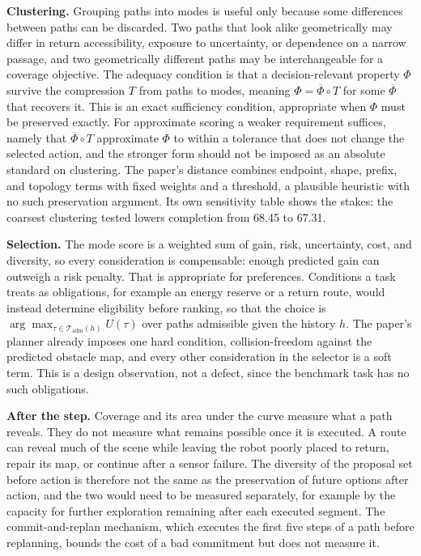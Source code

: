 \documentclass[11pt]{article}
\theoremstyle{plain}
\theoremstyle{remark}
\begin{document}
\textbf{Clustering.} Grouping paths into modes is useful only because some differences between paths can be discarded. Two paths that look alike geometrically may differ in return accessibility, exposure to uncertainty, or dependence on a narrow passage, and two geometrically different paths may be interchangeable for a coverage objective. The adequacy condition is that a decision-relevant property $\Phi$ survive the compression $T$ from paths to modes, meaning $\Phi=\overline{\Phi}\circ T$ for some $\overline{\Phi}$ that recovers it. This is an exact sufficiency condition, appropriate when $\Phi$ must be preserved exactly. For approximate scoring a weaker requirement suffices, namely that $\overline{\Phi}\circ T$ approximate $\Phi$ to within a tolerance that does not change the selected action, and the stronger form should not be imposed as an absolute standard on clustering. The paper's distance combines endpoint, shape, prefix, and topology terms with fixed weights and a threshold, a plausible heuristic with no such preservation argument. Its own sensitivity table shows the stakes: the coarsest clustering tested lowers completion from 68.45 to 67.31.

\textbf{Selection.} The mode score is a weighted sum of gain, risk, uncertainty, cost, and diversity, so every consideration is compensable: enough predicted gain can outweigh a risk penalty. That is appropriate for preferences. Conditions a task treats as obligations, for example an energy reserve or a return route, would instead determine eligibility before ranking, so that the choice is $\arg\max_{\tau\in\mathcal T_{\mathrm{adm}}(h)}U(\tau)$ over paths admissible given the history $h$. The paper's planner already imposes one hard condition, collision-freedom against the predicted obstacle map, and every other consideration in the selector is a soft term. This is a design observation, not a defect, since the benchmark task has no such obligations.

\textbf{After the step.} Coverage and its area under the curve measure what a path reveals. They do not measure what remains possible once it is executed. A route can reveal much of the scene while leaving the robot poorly placed to return, repair its map, or continue after a sensor failure. The diversity of the proposal set before action is therefore not the same as the preservation of future options after action, and the two would need to be measured separately, for example by the capacity for further exploration remaining after each executed segment. The commit-and-replan mechanism, which executes the first five steps of a path before replanning, bounds the cost of a bad commitment but does not measure it.
\end{document}
